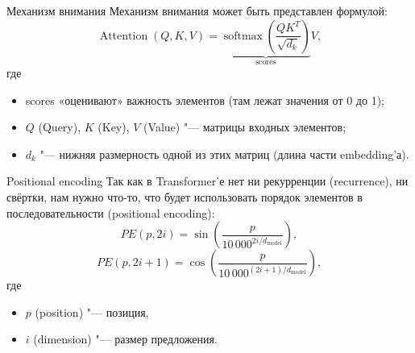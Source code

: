 \begin{frame}[fragile]{Механизм внимания}%
  Механизм внимания может быть представлен формулой:
  \begin{equation}\label{scaled-dot-product-attention}%
    \operatorname{Attention}(Q, K, V) = \underbrace{
      \operatorname{softmax}\left(
        \frac{QK^T}{\sqrt{d_k}}
      \right)
    }_{\text{scores}}
    V,
  \end{equation}
  где
  \begin{itemize}%
    \item scores «оценивают» важность элементов (там лежат значения от 0 до 1);
    \item $Q$ (Query), $K$ (Key), $V$ (Value) "--- матрицы входных элементов;
    \item $d_k$ "--- нижняя размерность одной из этих матриц (длина части embedding'а).
  \end{itemize}
\end{frame}


\begin{frame}[fragile]{Positional encoding}%
  Так как в Transformer'е нет ни рекурренции (recurrence), ни свёртки, нам нужно что-то, что будет использовать порядок элементов в последовательности (positional encoding):
  \begin{equation}\label{positional-encoding}%
    PE(p, 2i) = \sin\left( \frac{p}{10\,000^{2i / d_{\text{model}}}} \right),
  \end{equation}
  \begin{equation}\label{positional-encoding-2}%
    PE(p, 2i + 1) = \cos\left( \frac{p}{10\,000^{(2i + 1) / d_{\text{model}}}} \right),
  \end{equation}
  где
  \begin{itemize}%
    \item $p$ (position) "--- позиция,
    \item $i$ (dimension) "--- размер предложения.
  \end{itemize}
\end{frame}
